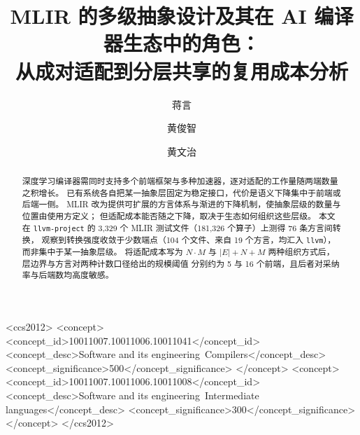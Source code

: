 \documentclass[acmsmall, screen=true, nonacm=true]{acmart}
\begin{document}
\title{MLIR 的多级抽象设计及其在 AI 编译器生态中的角色：\\从成对适配到分层共享的复用成本分析}

\author{蒋言}

\author{黄俊智}

\author{黄文治}

\renewcommand{\shortauthors}{}

\begin{abstract}
深度学习编译器需同时支持多个前端框架与多种加速器，逐对适配的工作量随两端数量之积增长。
已有系统各自把某一抽象层固定为稳定接口，代价是语义下降集中于前端或后端一侧。
MLIR 改为提供可扩展的方言体系与渐进的下降机制，使抽象层级的数量与位置由使用方定义；
但适配成本能否随之下降，取决于生态如何组织这些层级。
本文在 \texttt{llvm-project} 的 3,329 个 MLIR 测试文件（181,326 个算子）上测得 76 条方言间转换，
观察到转换强度收敛于少数端点（104 个文件、来自 19 个方言，均汇入 \texttt{llvm}），
而非集中于某一抽象层级。
将适配成本写为 $N\cdot M$ 与 $|E|+N+M$ 两种组织方式后，层边界与方言对两种计数口径给出的规模阈值
分别约为 5 与 16 个前端，且后者对采纳率与后端数均高度敏感。
\end{abstract}

\begin{CCSXML}
<ccs2012>
 <concept>
  <concept_id>10011007.10011006.10011041</concept_id>
  <concept_desc>Software and its engineering~Compilers</concept_desc>
  <concept_significance>500</concept_significance>
 </concept>
 <concept>
  <concept_id>10011007.10011006.10011008</concept_id>
  <concept_desc>Software and its engineering~Intermediate languages</concept_desc>
  <concept_significance>300</concept_significance>
 </concept>
</ccs2012>
\end{CCSXML}
\end{document}
